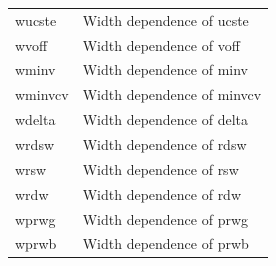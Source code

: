 \begin{longtable}{l l}
{\small wucste} & {\small Width dependence of ucste} \\
{\small wvoff} & {\small Width dependence of voff} \\
{\small wminv} & {\small Width dependence of minv} \\
{\small wminvcv} & {\small Width dependence of minvcv} \\
{\small wdelta} & {\small Width dependence of delta} \\
{\small wrdsw} & {\small Width dependence of rdsw } \\
{\small wrsw} & {\small Width dependence of rsw} \\
{\small wrdw} & {\small Width dependence of rdw} \\

{\small wprwg} & {\small Width dependence of prwg } \\
{\small wprwb} & {\small Width dependence of prwb } \\


\end{longtable}
